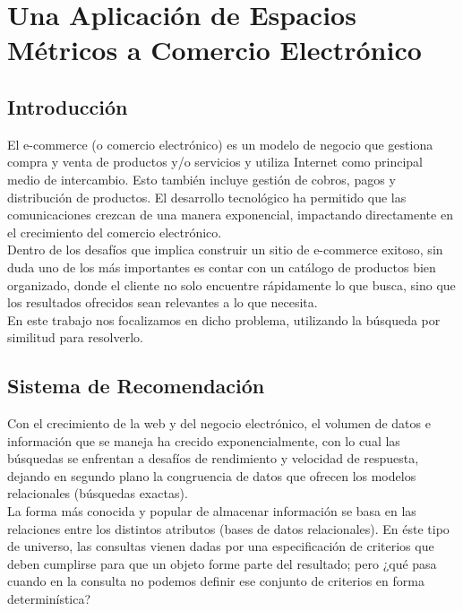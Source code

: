 \chapter{Una Aplicaci\'on de Espacios M\'etricos a Comercio Electr\'onico}

\section{Introducci\'on}

El e-commerce (o comercio electr\'onico) es un modelo de negocio que gestiona compra y venta de productos y/o servicios y utiliza Internet como principal medio de intercambio. Esto tambi\'en incluye gesti\'on de cobros, pagos y distribuci\'on de productos. El desarrollo tecnol\'ogico ha permitido que las comunicaciones crezcan de una manera exponencial, impactando directamente en el crecimiento del comercio electr\'onico.\\

Dentro de los desaf\'ios que implica construir un sitio de e-commerce exitoso, sin duda uno de los m\'as importantes es contar con un cat\'alogo de productos bien organizado, donde el cliente no solo encuentre r\'apidamente lo que busca, sino que los resultados ofrecidos sean relevantes a lo que necesita.\\

En este trabajo nos focalizamos en dicho problema, utilizando la b\'usqueda por similitud para resolverlo.\\

\section{Sistema de Recomendaci\'on}

Con el crecimiento de la web y del negocio electr\'onico, el volumen de datos e informaci\'on que se maneja ha crecido exponencialmente, con lo cual las b\'usquedas se enfrentan a desaf\'ios de rendimiento y velocidad de respuesta, dejando en segundo plano la congruencia de datos que ofrecen los modelos relacionales (b\'usquedas exactas).\\

La forma m\'as conocida y popular de almacenar informaci\'on se basa en las relaciones entre los distintos atributos (bases de datos relacionales). En \'este tipo de universo, las consultas vienen dadas por una especificaci\'on de criterios que deben cumplirse para que un objeto forme parte del resultado; pero ¿qu\'e pasa cuando en la consulta no podemos definir ese conjunto de criterios en forma determin\'istica?\\

